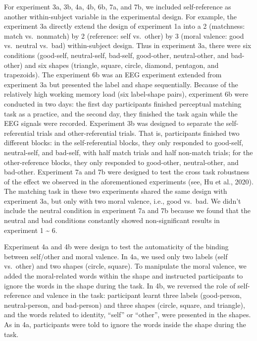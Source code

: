 \documentclass[
  english,
  man]{apa6}
\begin{document}
For experiment 3a, 3b, 4a, 4b, 6b, 7a, and 7b, we included self-reference as another within-subject variable in the experimental design. For example, the experiment 3a directly extend the design of experiment 1a into a 2 (matchness: match vs.~nonmatch) by 2 (reference: self vs.~other) by 3 (moral valence: good vs.~neutral vs.~bad) within-subject design. Thus in experiment 3a, there were six conditions (good-self, neutral-self, bad-self, good-other, neutral-other, and bad-other) and six shapes (triangle, square, circle, diamond, pentagon, and trapezoids). The experiment 6b was an EEG experiment extended from experiment 3a but presented the label and shape sequentially. Because of the relatively high working memory load (six label-shape pairs), experiment 6b were conducted in two days: the first day participants finished perceptual matching task as a practice, and the second day, they finished the task again while the EEG signals were recorded. Experiment 3b was designed to separate the self-referential trials and other-referential trials. That is, participants finished two different blocks: in the self-referential blocks, they only responded to good-self, neutral-self, and bad-self, with half match trials and half non-match trials; for the other-reference blocks, they only responded to good-other, neutral-other, and bad-other. Experiment 7a and 7b were designed to test the cross task robustness of the effect we observed in the aforementioned experiments (see, Hu et al., 2020). The matching task in these two experiments shared the same design with experiment 3a, but only with two moral valence, i.e., good vs.~bad. We didn't include the neutral condition in experiment 7a and 7b because we found that the neutral and bad conditions constantly showed non-significant results in experiment 1 \textasciitilde{} 6.

Experiment 4a and 4b were design to test the automaticity of the binding between self/other and moral valence. In 4a, we used only two labels (self vs.~other) and two shapes (circle, square). To manipulate the moral valence, we added the moral-related words within the shape and instructed participants to ignore the words in the shape during the task. In 4b, we reversed the role of self-reference and valence in the task: participant learnt three labels (good-person, neutral-person, and bad-person) and three shapes (circle, square, and triangle), and the words related to identity, \enquote{self} or \enquote{other}, were presented in the shapes. As in 4a, participants were told to ignore the words inside the shape during the task.
\end{document}

